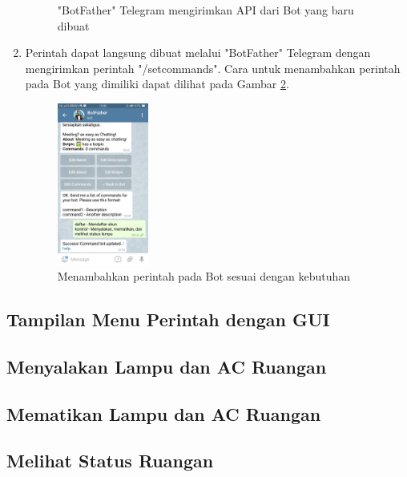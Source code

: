 \begin{enumerate}
\begin{figure}[H]
{		}
		\caption{"BotFather" Telegram mengirimkan API dari Bot yang baru dibuat}
		\label{figure:api}
	\end{figure}
	\item Perintah dapat langsung dibuat melalui "BotFather" Telegram dengan mengirimkan perintah "/setcommands". Cara untuk menambahkan perintah pada Bot yang dimiliki dapat dilihat pada Gambar \ref{figure:cmd}.
	\begin{figure}[H]
		\centerline {
			\includegraphics[width=3cm]{bab5/img/cmd.jpeg}
		}
		\caption{Menambahkan perintah pada Bot sesuai dengan kebutuhan}
		\label{figure:cmd}
	\end{figure}
\end{enumerate}

\subsection{Tampilan Menu Perintah dengan GUI}


\subsection{Menyalakan Lampu dan AC Ruangan}


\subsection{Mematikan Lampu dan AC Ruangan}

\pagebreak
\subsection{Melihat Status Ruangan}


